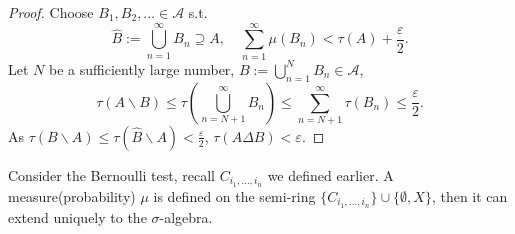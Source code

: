 \begin{proof}[Proof]
    Choose $B_1,B_2,\dots\in \mathscr{A}$ s.t.
	\[
	\hat{B} := \bigcup_{n=1}^\infty B_n \supseteq A, \quad
	\sum_{n=1}^{\infty}\mu(B_n) < \tau(A) + \frac{\varepsilon}{2}.
	\]
	Let $N$ be a sufficiently large number,
	$B := \bigcup_{n=1}^N B_n\in \mathscr{A}$,
	\[
	\tau(A\backslash B) \le \tau\left(\bigcup_{n=N+1}^\infty B_n\right)
	\le \sum_{n=N+1}^{\infty} \tau(B_n)\le \frac{\varepsilon}{2}.
	\]
	As $\tau(B \backslash A)\le \tau(\hat{B} \backslash A)< \frac{\varepsilon}{2}$,
	$\tau(A\Delta B) < \varepsilon$.
\end{proof}

\begin{example}
    Consider the Bernoulli test,
	recall $C_{i_1,\dots,i_n}$ we defined earlier.
	A measure(probability) $\mu$ is defined on
	the semi-ring $\{C_{i_1,\dots,i_n}\}\cup\{\emptyset,X\}$,
	then it can extend uniquely to the $\sigma$-algebra.
\end{example}
